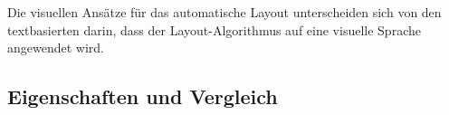 Die visuellen Ansätze für das automatische Layout unterscheiden sich von den textbasierten darin, dass der Layout-Algorithmus auf eine visuelle Sprache angewendet wird.





\subsection{Eigenschaften und Vergleich}
